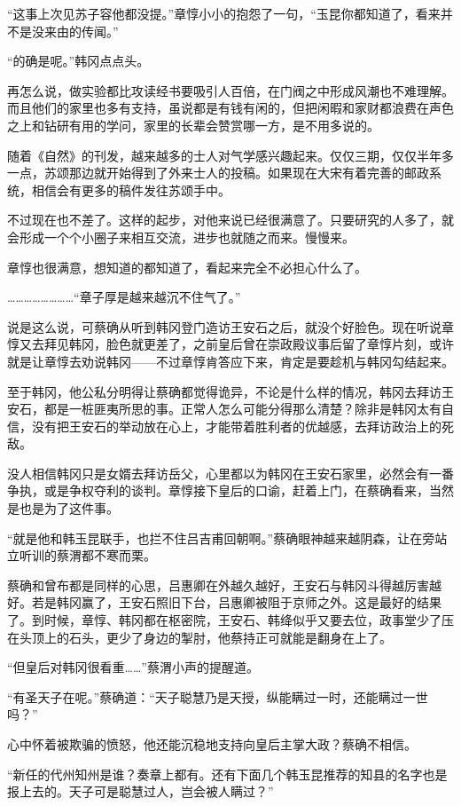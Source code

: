 “这事上次见苏子容他都没提。”章惇小小的抱怨了一句，“玉昆你都知道了，看来并不是没来由的传闻。”

“的确是呢。”韩冈点点头。

再怎么说，做实验都比攻读经书要吸引人百倍，在门阀之中形成风潮也不难理解。而且他们的家里也多有支持，虽说都是有钱有闲的，但把闲暇和家财都浪费在声色之上和钻研有用的学问，家里的长辈会赞赏哪一方，是不用多说的。

随着《自然》的刊发，越来越多的士人对气学感兴趣起来。仅仅三期，仅仅半年多一点，苏颂那边就开始得到了外来士人的投稿。如果现在大宋有着完善的邮政系统，相信会有更多的稿件发往苏颂手中。

不过现在也不差了。这样的起步，对他来说已经很满意了。只要研究的人多了，就会形成一个个小圈子来相互交流，进步也就随之而来。慢慢来。

章惇也很满意，想知道的都知道了，看起来完全不必担心什么了。

……………………“章子厚是越来越沉不住气了。”

说是这么说，可蔡确从听到韩冈登门造访王安石之后，就没个好脸色。现在听说章惇又去拜见韩冈，脸色就更差了，之前皇后曾在崇政殿议事后留了章惇片刻，或许就是让章惇去劝说韩冈——不过章惇肯答应下来，肯定是要趁机与韩冈勾结起来。

至于韩冈，他公私分明得让蔡确都觉得诡异，不论是什么样的情况，韩冈去拜访王安石，都是一桩匪夷所思的事。正常人怎么可能分得那么清楚？除非是韩冈太有自信，没有把王安石的举动放在心上，才能带着胜利者的优越感，去拜访政治上的死敌。

没人相信韩冈只是女婿去拜访岳父，心里都以为韩冈在王安石家里，必然会有一番争执，或是争权夺利的谈判。章惇接下皇后的口谕，赶着上门，在蔡确看来，当然是也是为了这件事。

“就是他和韩玉昆联手，也拦不住吕吉甫回朝啊。”蔡确眼神越来越阴森，让在旁站立听训的蔡渭都不寒而栗。

蔡确和曾布都是同样的心思，吕惠卿在外越久越好，王安石与韩冈斗得越厉害越好。若是韩冈赢了，王安石照旧下台，吕惠卿被阻于京师之外。这是最好的结果了。到时候，章惇、韩冈都在枢密院，王安石、韩绛似乎又要去位，政事堂少了压在头顶上的石头，更少了身边的掣肘，他蔡持正可就能是翻身在上了。

“但皇后对韩冈很看重……”蔡渭小声的提醒道。

“有圣天子在呢。”蔡确道：“天子聪慧乃是天授，纵能瞒过一时，还能瞒过一世吗？”

心中怀着被欺骗的愤怒，他还能沉稳地支持向皇后主掌大政？蔡确不相信。

“新任的代州知州是谁？奏章上都有。还有下面几个韩玉昆推荐的知县的名字也是报上去的。天子可是聪慧过人，岂会被人瞒过？”

